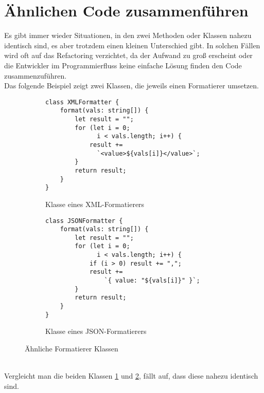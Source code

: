 \section{Ähnlichen Code zusammenführen}
Es gibt immer wieder Situationen, in den zwei Methoden oder Klassen nahezu identisch sind, es aber trotzdem einen kleinen Unterschied gibt.
In solchen Fällen wird oft auf das Refactoring verzichtet, da der Aufwand zu groß erscheint oder die Entwickler im Programmierfluss keine einfache Lösung finden den Code zusammenzuführen.\citep[S. 326 f.]{fiveLines.2023}\\
Das folgende Beispiel zeigt zwei Klassen, die jeweils einen Formatierer umsetzen.
\begin{figure}[ht]
    \begin{subfigure}[t]{0.49\textwidth}
        \centering
        \begin{minipage}[t]{\linewidth}
            \begin{verbatim}
class XMLFormatter {
    format(vals: string[]) {
        let result = "";
        for (let i = 0;
              i < vals.length; i++) {
            result +=
              `<value>${vals[i]}</value>`;
        }
        return result;
    }
}
            \end{verbatim}
        \end{minipage}
        \caption{Klasse eines XML-Formatierers}
        \label{fig:XmlAnfang}
    \end{subfigure}
    \hfill
    \begin{subfigure}[t]{0.49\textwidth}
        \centering
        \begin{minipage}[t]{\linewidth}
            \begin{verbatim}
class JSONFormatter {
    format(vals: string[]) {
        let result = "";
        for (let i = 0;
              i < vals.length; i++) {
            if (i > 0) result += ",";
            result +=
                `{ value: "${vals[i]}" }`;
        }
        return result;
    }
}
            \end{verbatim}
        \end{minipage}
        \caption{Klasse eines JSON-Formatierers}
        \label{fig:JsonAnfang}
    \end{subfigure}
    \caption{Ähnliche Formatierer Klassen \citep[S. 327]{fiveLines.2023}}
    \label{fig:FormatterAnfang}
\end{figure}\\
Vergleicht man die beiden Klassen \ref{fig:XmlAnfang} und \ref{fig:JsonAnfang}, fällt auf, dass diese nahezu identisch sind.
